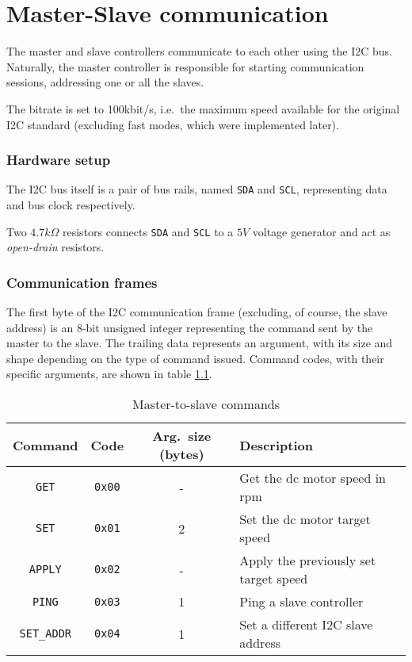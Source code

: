 \chapter{Master-Slave communication}
\label{ch:master-slave-comm}
The master and slave controllers communicate to each other using the I2C
bus. Naturally, the master controller is responsible for starting communication
sessions, addressing one or all the slaves.

The bitrate is set to 100kbit/s, i.e.\ the maximum speed available for the
original I2C standard\cite{i2c-ref} (excluding fast modes, which were
implemented later).

\subsection{Hardware setup}
The I2C bus itself is a pair of bus rails, named \texttt{SDA} and \texttt{SCL},
representing data and bus clock respectively.

Two $4.7 k\Omega$ resistors connects \texttt{SDA} and \texttt{SCL} to a $5V$
voltage generator and act as \emph{open-drain} resistors.

\subsection{Communication frames}
The first byte of the I2C communication frame (excluding, of course, the slave
address) is an 8-bit unsigned integer representing the command sent by the
master to the slave. The trailing data represents an argument, with its size
and shape depending on the type of command issued. Command codes, with their
specific arguments, are shown in table \ref{tab:i2c-commands}.

\begin{table}[ht]
  \begin{tabularx}{\textwidth}{c c c X}
    \toprule
    Command & Code & Arg.\ size (bytes) & Description \\
    \midrule
      \texttt{GET}       & \texttt{0x00} & - & Get the dc motor speed in rpm \\
      \texttt{SET}       & \texttt{0x01} & 2 & Set the dc motor target speed \\
      \texttt{APPLY}     & \texttt{0x02} & - & Apply the previously set target speed \\
      \texttt{PING}      & \texttt{0x03} & 1 & Ping a slave controller \\
      \texttt{SET\_ADDR} & \texttt{0x04} & 1 & Set a different I2C slave address \\
    \bottomrule
  \end{tabularx}
  \caption{Master-to-slave commands}
  \label{tab:i2c-commands}
\end{table}
